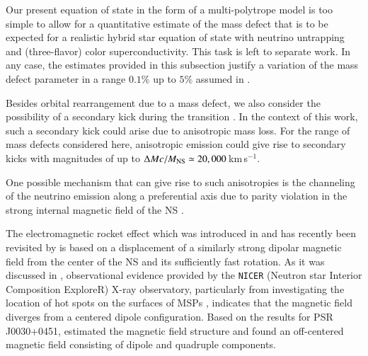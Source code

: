 \documentclass[main.tex]{subfiles}
\begin{document}
        Our present equation of state in the form of a multi-polytrope model is too simple to allow for a quantitative estimate of the mass defect that is to be expected for a realistic hybrid star equation of state with neutrino untrapping and (three-flavor) color superconductivity. This task is left to separate work.
        In any case, the estimates provided in this subsection justify a variation of the mass defect parameter in a range $0.1\%$ up to $5\%$ assumed in \cite{Jiang:apj15} \citep[see also][]{Jiang:raa2021}.
        
        Besides orbital rearrangement due to a mass defect, we also consider the possibility of a secondary kick during the transition \citep{Hobbs:2005yx,Bombaci:2004nu}. 
        In the context of this work, such a secondary kick could arise due to anisotropic mass loss. 
        For the range of mass defects considered here, anisotropic emission could give rise to secondary kicks with magnitudes of up to $\Delta M c / M _{\rm NS} \simeq 20,000$\,km\,s$^{-1}$. 
        
        One possible mechanism that can give rise to such anisotropies is the channeling of the neutrino emission along a preferential axis due to parity violation in the strong internal magnetic field of the NS  \citep[see][for recent examples with typical B-field strengths of $B\sim 10^{12}$ Gauss]{Berdermann:2006rk,Kaminski:2014jda,Fukushima:2024cpg}. 
        
        The electromagnetic rocket effect which was introduced in \cite{1975ApJ...201..447H} and has recently been revisited by \cite{Agalianou:2023lvv} is based on a displacement of a similarly strong dipolar magnetic field from the center of the NS and its sufficiently fast rotation.
        As it was discussed in \cite{Agalianou:2023lvv}, observational evidence provided by the \texttt{NICER} (Neutron star Interior Composition ExploreR) X-ray observatory, particularly from investigating the location of hot spots on the surfaces of MSPs \citep{Miller:2019cac, Riley:2019yda}, indicates that the magnetic field diverges from a centered dipole configuration.
         Based on the results for PSR J0030+0451, \cite{Kalapotharakos:2020rmz} estimated the magnetic field structure and found an off-centered magnetic field consisting of dipole and quadruple components. 
        
\end{document}
